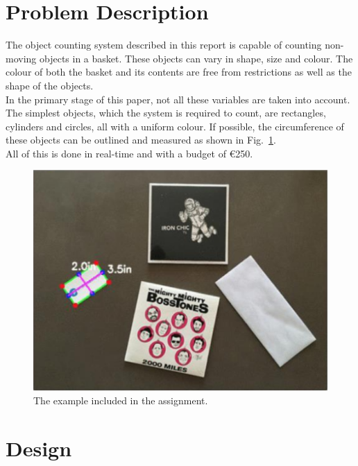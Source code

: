 \documentclass[11pt]{article}
\begin{document}
\section{Problem Description}

The object counting system described in this report is capable of counting non-moving objects in a basket. These objects can vary in shape, size and colour. The colour of both the basket and its contents are free from restrictions as well as the shape of the objects.\\
In the primary stage of this paper, not all these variables are taken into account. The simplest objects, which the system is required to count, are rectangles, cylinders and circles, all with a uniform colour. If possible, the circumference of these objects can be outlined and measured as shown in Fig.~\ref{fig:example}.\\ All of this is done in real-time and with a budget of \euro 250.

\begin{figure}[h]
\centering
  \includegraphics[width=0.7\linewidth]{opdracht.png}
  \caption{The example included in the assignment.}
  \label{fig:example}
\end{figure}

\section{Design}
\end{document}
